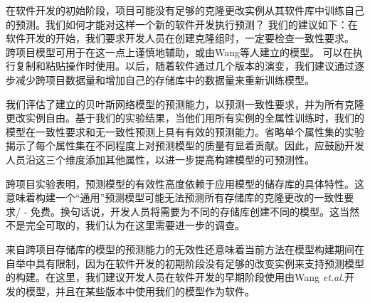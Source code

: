 {{在软件开发的初始阶段，项目可能没有足够的克隆更改实例从其软件库中训练自己的预测。我们如何才能对这样一个新的软件开发执行预测？} {我们的建议如下：在软件开发的开始，我们要求开发人员在创建克隆组时，一定要检查一致性要求。
跨项目模型可用于在这一点上谨慎地辅助，或由Wang等人建立的模型。 \cite {Wang2014}可以在执行复制和粘贴操作时使用。以后，随着软件通过几个版本的演变，我们建议通过逐步减少跨项目数据量和增加自己的存储库中的数据量来重新训练模型。}

我们评估了建立的贝叶斯网络模型的预测能力，以预测一致性要求，并为所有克隆更改实例自由。基于我们的实验结果，当他们用所有实例的全属性训练时，我们的模型在一致性要求和无一致性预测上具有有效的预测能力。省略单个属性集的实验揭示了每个属性集在不同程度上对预测模型的质量有显着贡献。因此，应鼓励开发人员沿这三个维度添加其他属性，以进一步提高构建模型的可预测性。


跨项目实验表明，预测模型的有效性高度依赖于应用模型的储存库的具体特性。这意味着构建一个“通用”预测模型可能无法预测所有存储库的克隆更改的一致性要求/ - 免费。换句话说，开发人员将需要为不同的存储库创建不同的模型。这当然不是完全可取的，我们认为在这里需要进一步的调查。

来自跨项目存储库的模型的预测能力的无效性还意味着当前方法在模型构建期间在自举中具有限制，因为在软件开发的初期阶段没有足够的改变实例来支持预测模型的构建。在这里，我们建议开发人员在软件开发的早期阶段使用由Wang {\sl et.al.}开发的模型，并且在某些版本中使用我们的模型作为软件。


}
